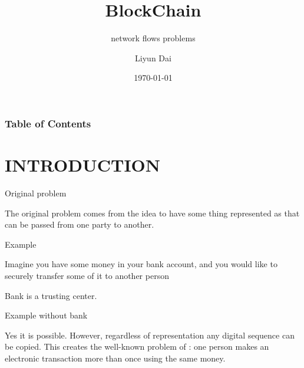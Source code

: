 \documentclass[serif]{beamer}
\title{BlockChain}
\subtitle{network flows problems}
\author{ Liyun Dai}
\institute{RISE, Southwest University, Chongqing, China}
\date{\today}
\begin{document}
\maketitle
\begin{frame}
  \frametitle{Table of Contents}
  \tableofcontents[currentsection]
\end{frame}

\section{INTRODUCTION}

\begin{frame}{Original problem}
	\begin{problem}
		The original problem comes from the idea to have some
		thing represented as {\color{red}{digital entity}} that can be passed {\color{red}{securely}}
		from one party to another.
	\end{problem}
\end{frame}

\begin{frame}{Example}
	\begin{example}
		Imagine you have some money in
		your bank account, and you would like to securely transfer
		some of it to another person
	\end{example}
	
	{\Huge Bank is a trusting center.}
\end{frame}

\begin{frame}{Example 	without bank }

	\begin{problem}
		Yes it is possible. However, regardless of representation any digital sequence can be copied.
		This creates the well-known problem of {\color{red}{“double-spending”}}:
		one person makes an electronic transaction more than once
		using the same money.
	\end{problem}
\end{frame}
\end{document}
